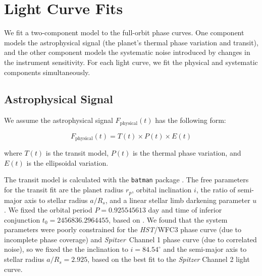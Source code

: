 \documentclass[twocolumn]{aastex61}
\newcommand{\project}[1]{\textsl{#1}}
\newcommand{\HST}{\project{HST}}
\newcommand{\Spitzer}{\project{Spitzer}}
\begin{document}
\section{Light Curve Fits}
We fit a two-component model to the full-orbit phase curves. One component models the astrophysical signal (the planet's thermal phase variation and transit), and the other component models the systematic noise introduced by changes in the instrument sensitivity. For each light curve, we fit the physical and systematic components simultaneously. 

\subsection{Astrophysical Signal}
We assume the astrophysical signal $F_\mathrm{physical}(t)$ has the following form:

\begin{equation}
	F_\mathrm{physical}(t) = T(t) \times P(t) \times E(t)
\end{equation}

where $T(t)$ is the transit model, $P(t)$ is the thermal phase variation, and $E(t)$ is the ellipsoidal variation. 

The transit model is calculated with the \texttt{batman} package \citep{kreidberg15a}. The free parameters for the transit fit are the planet radius $r_p$, orbital inclination $i$, the ratio of semi-major axis to stellar radius $a/R_s$, and a linear stellar limb darkening parameter $u$.  We fixed the orbital period $P = 0.925545613$ day and time of inferior conjunction $t_0 = 2456836.2964455$, based on \cite{southworth15}.  We found that the system parameters were poorly constrained for the \HST/WFC3 phase curve (due to incomplete phase coverage) and \Spitzer\ Channel 1 phase curve (due to correlated noise), so we fixed the the inclination to $i = 84.54^\circ$ and the semi-major axis to stellar radius $a/R_s  = 2.925$, based on the best fit to the \emph{Spitzer} Channel 2 light curve.
\end{document}
